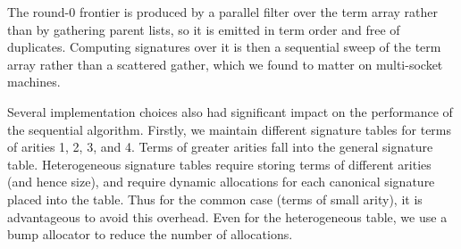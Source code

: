 The round-0 frontier is produced by a parallel filter over the term array
rather than by gathering parent lists, so it is emitted in term order and
free of duplicates. Computing signatures over it is then a sequential sweep
of the term array rather than a scattered gather, which we found to matter
on multi-socket machines.

Several implementation choices also had significant impact on the performance
of the sequential algorithm. Firstly, we maintain different signature tables
for terms of arities 1, 2, 3, and 4. Terms of greater arities fall into the
general signature table. Heterogeneous signature tables require storing terms
of different arities (and hence size), and require dynamic allocations for
each canonical signature placed into the table. Thus for the common case
(terms of small arity), it is advantageous to avoid this overhead. Even for
the heterogeneous table, we use a bump allocator to reduce the number of
allocations.
